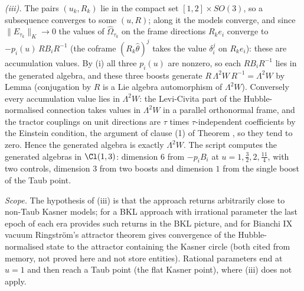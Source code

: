 \emph{(iii).} The pairs $(u_{k}, R_{k})$ lie in the compact set $[1, 2] \times SO(3)$, so a subsequence converges to some $(u, R)$; along it the models converge, and since $\|E_{\tau_{k}}\|_{K} \to 0$ the values of $\widehat\Omega_{\tau_{k}}$ on the frame directions $R_{k}e_{i}$ converge to $-p_{i}(u)\,RB_{i}R^{-1}$ (the coframe $(R_{k}\hat\theta)^{j}$ takes the value $\delta^{j}_{i}$ on $R_{k}e_{i}$): these are accumulation values. By (i) all three $p_{i}(u)$ are nonzero, so each $RB_{i}R^{-1}$ lies in the generated algebra, and these three boosts generate $R\,\Lambda^{2}W\,R^{-1} = \Lambda^{2}W$ by Lemma  (conjugation by $R$ is a Lie algebra automorphism of $\Lambda^{2}W$). Conversely every accumulation value lies in $\Lambda^{2}W$: the Levi-Civita part of the Hubble-normalised connection takes values in $\Lambda^{2}W$ in a parallel orthonormal frame, and the tractor couplings on unit directions are $\tau$ times $\tau$-independent coefficients by the Einstein condition, the argument of clause (1) of Theorem , so they tend to zero. Hence the generated algebra is exactly $\Lambda^{2}W$. The script computes the generated algebras in $\Cl(1,3)$: dimension $6$ from $-p_{i}B_{i}$ at $u = 1, \tfrac32, 2, \tfrac{11}{4}$, with two controls, dimension $3$ from two boosts and dimension $1$ from the single boost of the Taub point.

\emph{Scope.} The hypothesis of (iii) is that the approach returns arbitrarily close to non-Taub Kasner models; for a BKL approach with irrational parameter the last epoch of each era provides such returns in the BKL picture, and for Bianchi IX vacuum Ringstr\"om's attractor theorem gives convergence of the Hubble-normalised state to the attractor containing the Kasner circle (both cited from memory, not proved here and not store entities). Rational parameters end at $u = 1$ and then reach a Taub point (the flat Kasner point), where (iii) does not apply.
